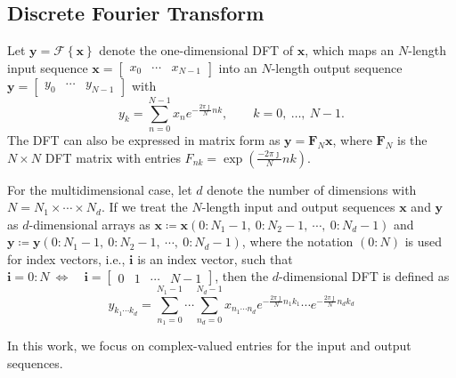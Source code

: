 \documentclass{gtac}
\theoremstyle{problemstyle}
\begin{document}
\subsection{Discrete Fourier Transform}
Let $\mathbf{y} = \mathcal{F}\left\{ \mathbf{x} \right\}$ denote the one-dimensional DFT of $\mathbf{x}$, which maps an $N$-length input sequence $\mathbf{x} = \begin{bmatrix} x_0 &  \cdots & x_{N-1} \end{bmatrix}$ into an $N$-length output sequence $\mathbf{y} = \begin{bmatrix} y_0 & \cdots & y_{N-1} \end{bmatrix}$ with
\begin{equation}
y_k = \sum_{n=0}^{N-1}{x_n e^{-\frac{2 \pi \jmath}{N}nk}}, \qquad k = 0, \ \ldots, \ N-1.
\label{eq:dft}
\end{equation}
The DFT can also be expressed in matrix form as $\mathbf{y} = \mathbf{F}_N \mathbf{x}$, where $\mathbf{F}_N$ is the $N \times N$ DFT matrix with entries $F_{nk} = \exp (\frac{-2\pi \jmath}{N} nk )$.

For the multidimensional case, let $d$ denote the number of dimensions with $N=N_1 \times \cdots \times N_d$. If we treat the $N$-length input and output sequences $\mathbf{x}$ and $\mathbf{y}$ as $d$-dimensional arrays as $\mathbf{x} \coloneq \mathbf{x}(0 \colon N_1-1,\ 0 \colon N_2-1, \ \cdots,\ 0 \colon N_d-1)$ and $\mathbf{y} \coloneq \mathbf{y}(0 \colon N_1-1,\ 0\colon N_2-1, \ \cdots,\ 0 \colon N_d-1)$, where the notation $(0 \colon N)$ is used for index vectors, i.e., $\mathbf{i}$ is an index vector, such that $\mathbf{i}=0 \colon N \ \Leftrightarrow \quad \mathbf{i}=\begin{bmatrix} 0 & 1 & \cdots & N-1 \end{bmatrix}$, then the $d$-dimensional DFT is defined as
\begin{equation}
y_{k_1 \cdots k_d} = \sum_{n_1=0}^{N_1-1}{\cdots}\sum_{n_d=0}^{N_d-1}{x_{n_1 \cdots n_d} e^{-\frac{2 \pi \jmath}{N}n_1k_1} \cdots e^{-\frac{2 \pi \jmath}{N}n_d k_d}}
\label{eq:multi_dimdft}
\end{equation}

In this work, we focus on complex-valued entries for the input and output sequences. 
\end{document}
